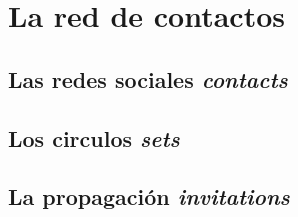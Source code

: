 \chapter{La red de contactos}

\section{Las redes sociales \emph{contacts}}
\section{Los circulos \emph{sets}}
\section{La propagación \emph{invitations}}
